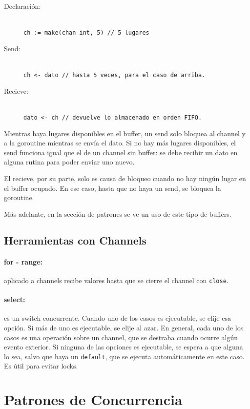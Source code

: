 \documentclass{article}
\begin{document}
\begin{description}
\item[Declaración:] \hfill \\
	\lstinline|ch := make(chan int, 5) // 5 lugares|
\item[Send:] \hfill \\
	\lstinline|ch <- dato // hasta 5 veces, para el caso de arriba.|
\item[Recieve:] \hfill \\
	\lstinline|dato <- ch // devuelve lo almacenado en orden FIFO.|
\end{description}

Mientras haya lugares disponibles en el buffer, un send solo bloquea al channel y a la goroutine mientras se envía el dato. Si no hay más lugares disponibles, el send funciona igual que el de un channel sin buffer: se debe recibir un dato en alguna rutina para poder enviar uno nuevo.

El recieve, por su parte, solo es causa de bloqueo cuando no hay ningún lugar en el buffer ocupado. En ese caso, hasta que no haya un send, se bloquea la goroutine.

Más adelante, en la sección de patrones se ve un uso de este tipo de buffers.

\subsection{Herramientas con Channels}
\paragraph{for - range:} aplicado a channels recibe valores hasta que se cierre el channel con \lstinline|close|.

\paragraph{select:} es un switch concurrente. Cuando uno de los casos es ejecutable, se elije esa opción. Si más de uno es ejecutable, se elije al azar. En general, cada uno de los casos es una operación sobre un channel, que se destraba cuando ocurre algún evento exterior. Si ninguna de las opciones es ejecutable, se espera a que alguna lo sea, salvo que haya un \lstinline|default|, que se ejecuta automáticamente en este caso. Es útil para evitar locks.

\section{Patrones de Concurrencia}
\end{document}
